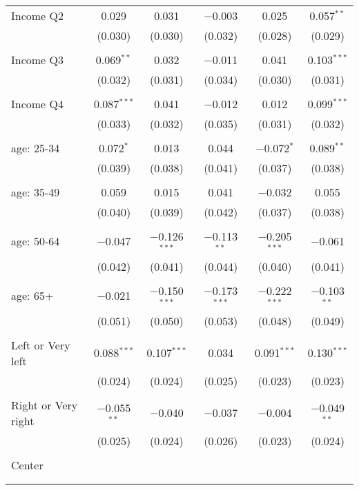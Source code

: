 \begin{tabular}{@{\extracolsep{5pt}}lccccc}
 Income Q2 & 0.029 & 0.031 & $-$0.003 & 0.025 & 0.057$^{**}$ \\ 
  & (0.030) & (0.030) & (0.032) & (0.028) & (0.029) \\ 
  & & & & & \\ 
 Income Q3 & 0.069$^{**}$ & 0.032 & $-$0.011 & 0.041 & 0.103$^{***}$ \\ 
  & (0.032) & (0.031) & (0.034) & (0.030) & (0.031) \\ 
  & & & & & \\ 
 Income Q4 & 0.087$^{***}$ & 0.041 & $-$0.012 & 0.012 & 0.099$^{***}$ \\ 
  & (0.033) & (0.032) & (0.035) & (0.031) & (0.032) \\ 
  & & & & & \\ 
 age: 25-34 & 0.072$^{*}$ & 0.013 & 0.044 & $-$0.072$^{*}$ & 0.089$^{**}$ \\ 
  & (0.039) & (0.038) & (0.041) & (0.037) & (0.038) \\ 
  & & & & & \\ 
 age: 35-49 & 0.059 & 0.015 & 0.041 & $-$0.032 & 0.055 \\ 
  & (0.040) & (0.039) & (0.042) & (0.037) & (0.038) \\ 
  & & & & & \\ 
 age: 50-64 & $-$0.047 & $-$0.126$^{***}$ & $-$0.113$^{**}$ & $-$0.205$^{***}$ & $-$0.061 \\ 
  & (0.042) & (0.041) & (0.044) & (0.040) & (0.041) \\ 
  & & & & & \\ 
 age: 65+ & $-$0.021 & $-$0.150$^{***}$ & $-$0.173$^{***}$ & $-$0.222$^{***}$ & $-$0.103$^{**}$ \\ 
  & (0.051) & (0.050) & (0.053) & (0.048) & (0.049) \\ 
  & & & & & \\ 
 Left or Very left & 0.088$^{***}$ & 0.107$^{***}$ & 0.034 & 0.091$^{***}$ & 0.130$^{***}$ \\ 
  & (0.024) & (0.024) & (0.025) & (0.023) & (0.023) \\ 
  & & & & & \\ 
 Right or Very right & $-$0.055$^{**}$ & $-$0.040 & $-$0.037 & $-$0.004 & $-$0.049$^{**}$ \\ 
  & (0.025) & (0.024) & (0.026) & (0.023) & (0.024) \\ 
  & & & & & \\ 
 Center &  &  &  &  &  \\ 
  &  &  &  &  &  \\ 
  & & & & & \\ 

\end{tabular}
